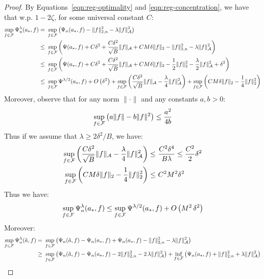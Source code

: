 \begin{proof}
By Equations~\eqref{eqn:reg-optimality} and \eqref{eqn:reg-concentration}, we have that w.p. $1-2\zeta$, for some universal constant $C$:
\begin{align}
   \sup_{f\in {\mathcal F}} \Psi_n^{\lambda}(a_*, f)
    =~& \sup_{f\in {\mathcal F}} \left(\Psi_n(a_*, f) - \|f\|_{2,n}^2 - \lambda \|f\|_{{\mathcal A}}^2\right)\\
    \leq~& \sup_{f\in {\mathcal F}} \left(\Psi(a_*, f) + C \delta^2 + \frac{C\delta^2}{\sqrt{B}}\|f\|_{{\mathcal A}} + C M \delta \|f\|_2 - \|f\|_{2,n}^2 - \lambda \|f\|_{{\mathcal A}}^2\right)\\
    \leq~& \sup_{f\in {\mathcal F}} \left(\Psi(a_*, f) + C \delta^2 + \frac{C\delta^2}{\sqrt{B}}\|f\|_{{\mathcal A}}  + C M\delta \|f\|_2 - \frac{1}{2} \|f\|_2^2 - \frac{\lambda}{2} \|f\|_{{\mathcal A}}^2 + \delta^2\right)\\
    \leq~& \sup_{f\in {\mathcal F}} \Psi^{\lambda/2}(a_*, f) + O\left(\delta^2\right)
    + \sup_{f\in {\mathcal F}} \left( \frac{C\delta^2}{\sqrt{B}}\|f\|_{{\mathcal A}} - \frac{\lambda}{4}\|f\|_{{\mathcal A}}^2\right) + \sup_{f\in {\mathcal F}} \left(C M\delta \|f\|_2 - \frac{1}{4}\|f\|_{2}^2\right)
\end{align}
Moreover, observe that for any norm $\|\cdot\|$ and any constants $a,b>0$:
\begin{align}
    \sup_{f\in {\mathcal F}} \left(a\|f\| - b \|f\|^2\right) \leq \frac{a^2}{4b}
\end{align}
Thus if we assume that $\lambda\geq 2\delta^2/B$, we have:
\begin{align}
\sup_{f\in {\mathcal F}} \left( \frac{C\delta^2}{\sqrt{B}}\|f\|_{{\mathcal A}} - \frac{\lambda}{4}\|f\|_{{\mathcal A}}^2\right) \leq~& \frac{C^2 \delta^4}{B \lambda} \leq \frac{C^2}{2} \delta^2\\
    \sup_{f\in {\mathcal F}} \left(C M\delta \|f\|_2 - \frac{1}{4}\|f\|_{2}^2\right) \leq~& C^2 M^2 \delta^2
\end{align}
Thus we have:
\begin{align}
    \sup_{f\in {\mathcal F}} \Psi_n^{\lambda}(a_*, f)\leq \sup_{f\in {\mathcal F}} \Psi^{\lambda/2}(a_*, f) + O\left(M^2\, \delta^2\right)
\end{align}
Moreover:
\begin{align}
\sup_{f\in \mcF} \Psi_n^{\lambda}(\hat{a}, f) =~& \sup_{f \in \mcF} \left(\Psi_n(\hat{a}, f) - \Psi_n(a_*, f) + \Psi_n(a_*, f) - \|f\|_{2,n}^2 - \lambda \|f\|_{\mcA}^2\right)\\ 
\geq~& \sup_{f \in \mcF} \left(\Psi_n(\hat{a}, f) - \Psi_n(a_*, f) - 2 \|f\|_{2,n}^2 - 2\, \lambda \|f\|_{\mcA}^2\right)  + \inf_{f\in \mcF} \left(\Psi_n(a_*, f) + \|f\|_{2,n}^2 + \lambda \|f\|_{\mcA}^2\right)

\end{align}
\end{proof}

